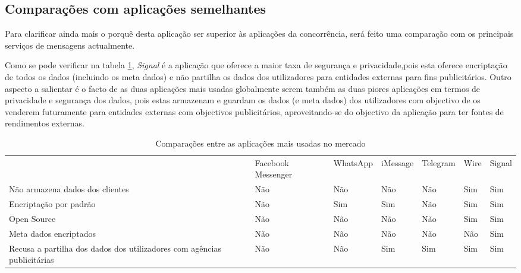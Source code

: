 \subsection{Comparações com aplicações semelhantes}
\label{sec:comparacoes}
Para clarificar ainda mais o porquê desta aplicação ser superior às aplicações da concorrência, será feito uma comparação com os principais serviços de mensagens actualmente.

Como se pode verificar na tabela \ref{tab:comparacoes}, \textit{Signal} é a aplicação que oferece a maior taxa de segurança e privacidade,pois esta oferece encriptação de todos os dados (incluindo os meta dados) e não partilha os dados dos utilizadores para entidades externas para fins publicitários.
Outro aspecto a salientar é o facto de as duas aplicações mais usadas globalmente serem também as duas piores aplicações em termos de privacidade e segurança dos dados, pois estas armazenam e guardam os dados (e meta dados) dos utilizadores com objectivo de os venderem futuramente para entidades externas com objectivos publicitários, aproveitando-se do objectivo da aplicação para ter fontes de rendimentos externas.

\begin{table}[!h]

\centering
\begin{adjustbox}{width=1\textwidth}
\begin{tabular}{lllllll}
                                & Facebook Messenger & WhatsApp & iMessage & Telegram & Wire & Signal \\
Não armazena dados dos clientes & Não                & Não      & Não      & Não      & Sim  & Sim    \\
Encriptação por padrão          & Não                & Sim      & Sim      & Não      & Sim  & Sim    \\
Open Source                     & Não                & Não      & Não      & Não      & Sim  & Sim    \\
Meta dados encriptados          & Não                & Não      & Não      & Não      & Não  & Sim    \\
Recusa a partilha dos dados dos utilizadores com agências publicitárias & Não & Não & Sim & Sim & Sim & Sim
\end{tabular}
\label{tab:comparacoes}
\end{adjustbox}
\caption{Comparações entre as aplicações mais usadas no mercado}
\cite{apps_comparation}
\end{table}


